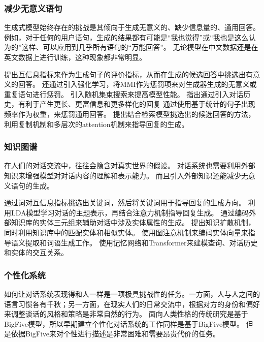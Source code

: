 \documentclass{clv3}
\begin{document}
\subsubsection{减少无意义语句}
生成式模型始终存在的挑战是其倾向于生成无意义的、缺少信息量的、通用回答\cite{li2016a}。
例如，对于任何的用户语句，生成的结果都有可能是“我也觉得”或“我也是这么认为的”这样、可以应用到几乎所有语句的“万能回答”。
无论模型在中文数据还是在英文数据上进行训练，这种现象都非常明显。

\cite{li2016a}提出互信息指标来作为生成句子的评价指标，从而在生成的候选回答中挑选出有意义的回答。
\cite{li2016deep, li2017adversarial}还通过引入强化学习，将MMI作为惩罚项来对生成器生成的无意义或重复语句进行惩罚。
\cite{shao2017generating}引入随机集束搜索来提高模型性能。
\cite{tian2017how}指出通过引入对话历史，有利于产生更长、更富信息和更多样化的回复
\cite{liu2018toward}通过使用基于统计的句子出现频率作为权重，来惩罚通用回答。
\cite{song2018an}提出结合检索模型挑选出的候选回答的方法，利用复制机制和多层次的attention机制来指导回复的生成。

\subsubsection{知识图谱}
在人们的对话交流中，往往会隐含对真实世界的假设。
对话系统也需要利用外部知识来增强模型对对话内容的理解和表示能力。
而且引入外部知识还能减少无意义语句的生成。

\cite{mou2016sequence}通过词对互信息指标挑选出关键词，然后将关键词用于指导回复的生成方向。
\cite{xing2017topic}利用LDA模型学习对话的主题表示，再结合注意力机制指导回复生成。
\cite{young2018augmenting}通过编码外部知识库的实体三元组来辅助对话中涉及实体属性的生成。
\cite{liu2018knowledge}提出知识扩散机制，同时利用知识库中的匹配实体和相似实体。
\cite{zhou2018commonsense}使用图注意机制来编码实体向量来指导语义提取和词语生成工作。
\cite{dinan2019wizard}使用记忆网络和Transformer来建模查询、对话历史和实体的交互关系。

\subsubsection{个性化系统}
如何让对话系统表现得和人一样是一项极具挑战性的任务。一方面，人与人之间的语言习惯各有千秋；另一方面，在现实人们的日常交流中，根据对方的身份和偏好来调整谈话的风格和策略是非常自然的行为。
面向人类性格的传统研究是基于BigFive模型\cite{goldberg1993the}，所以早期建立个性化对话系统的工作\cite{mairesse2007personage}同样是基于BigFive模型。
但是依据BigFive来对个性进行描述是非常困难和需要昂贵代价的任务\cite{zheng2019personalized}。
\end{document}
